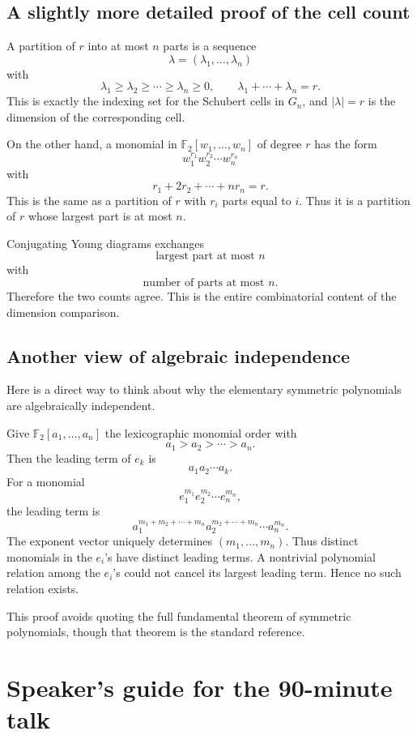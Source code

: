\documentclass[11pt]{article}
\theoremstyle{remark}
\newcommand{\F}{\mathbb F}
\newcommand{\Gn}{G_n}
\begin{document}
\subsection{A slightly more detailed proof of the cell count}

A partition of $r$ into at most $n$ parts is a sequence
\[
  \lambda=(\lambda_1,\dots,\lambda_n)
\]
with
\[
  \lambda_1\ge\lambda_2\ge\cdots\ge\lambda_n\ge 0,
  \qquad
  \lambda_1+\cdots+\lambda_n=r.
\]
This is exactly the indexing set for the Schubert cells in $\Gn$, and $|\lambda|=r$ is the dimension of the corresponding cell.

On the other hand, a monomial in $\F_2[w_1,\dots,w_n]$ of degree $r$ has the form
\[
  w_1^{r_1}w_2^{r_2}\cdots w_n^{r_n}
\]
with
\[
  r_1+2r_2+\cdots+nr_n=r.
\]
This is the same as a partition of $r$ with $r_i$ parts equal to $i$.  Thus it is a partition of $r$ whose largest part is at most $n$.

Conjugating Young diagrams exchanges
\[
  \text{largest part at most $n$}
\]
with
\[
  \text{number of parts at most $n$}.
\]
Therefore the two counts agree.  This is the entire combinatorial content of the dimension comparison.

\subsection{Another view of algebraic independence}

Here is a direct way to think about why the elementary symmetric polynomials are algebraically independent.

Give $\F_2[a_1,
\dots,a_n]$ the lexicographic monomial order with
\[
  a_1>a_2>\cdots>a_n.
\]
Then the leading term of $e_k$ is
\[
  a_1a_2\cdots a_k.
\]
For a monomial
\[
  e_1^{m_1}e_2^{m_2}\cdots e_n^{m_n},
\]
the leading term is
\[
  a_1^{m_1+m_2+\cdots+m_n}
  a_2^{m_2+\cdots+m_n}
  \cdots
  a_n^{m_n}.
\]
The exponent vector uniquely determines $(m_1,\dots,m_n)$.  Thus distinct monomials in the $e_i$'s have distinct leading terms.  A nontrivial polynomial relation among the $e_i$'s could not cancel its largest leading term.  Hence no such relation exists.

This proof avoids quoting the full fundamental theorem of symmetric polynomials, though that theorem is the standard reference.

\section{Speaker's guide for the 90-minute talk}
\end{document}
